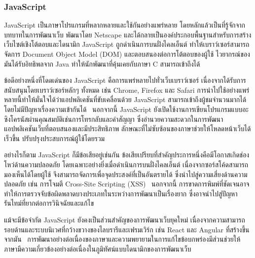 \documentclass[12pt,oneside,openright,a4paper]{cpe-thai-project}
\begin{document}
        \subsubsection{JavaScript}
            \begin{flushleft}
                JavaScript เป็นภาษาโปรแกรมที่หลากหลายและใช้กันอย่างแพร่หลาย โดยหลักแล้วเป็นที่รู้จักจากบทบาทในการพัฒนาเว็บ พัฒนาโดย Netscape และได้กลายเป็นองค์ประกอบพื้นฐานสำหรับการสร้างเว็บไซต์เชิงโต้ตอบและไดนามิก JavaScript ถูกดำเนินการบนฝั่งไคลเอ็นต์ ทำให้เบราว์เซอร์สามารถจัดการ Document Object Model (DOM) และตอบสนองต่อการโต้ตอบของผู้ใช้ ไวยากรณ์ของมันได้รับอิทธิพลจาก Java ทำให้นักพัฒนาที่คุ้นเคยกับภาษา C สามารถเข้าถึงได้~\cite{flanagan20js}
            \end{flushleft}
            \begin{flushleft}
                ข้อดีอย่างหนึ่งที่โดดเด่นของ JavaScript คือการแพร่หลายไปทั่วเว็บเบราว์เซอร์ เนื่องจากได้รับการสนับสนุนโดยเบราว์เซอร์หลักๆ ทั้งหมด เช่น Chrome, Firefox และ Safari การนำไปใช้อย่างแพร่หลายนี้ทำให้มั่นใจได้ว่าแอปพลิเคชันที่ขับเคลื่อนด้วย JavaScript สามารถเข้าถึงผู้ชมจำนวนมากได้โดยไม่มีปัญหาเรื่องความเข้ากันได้~\cite{flanagan20js} นอกจากนี้ JavaScript ยังเปิดใช้งานการเขียนโปรแกรมแบบอะซิงโครนัสผ่านคุณสมบัติเช่นการโทรกลับและคำสัญญา ซึ่งอำนวยความสะดวกในการพัฒนาแอปพลิเคชันเว็บที่ตอบสนองและมีประสิทธิภาพ ลักษณะที่ไม่ซับซ้อนของภาษาช่วยให้โหลดหน้าเว็บได้เร็วขึ้น ปรับปรุงประสบการณ์ผู้ใช้โดยรวม~\cite{crockford08js}
            \end{flushleft}
            \begin{flushleft}
                อย่างไรก็ตาม JavaScript ก็มีข้อเสียอยู่เช่นกัน ข้อเสียเปรียบที่สำคัญประการหนึ่งคือมีโอกาสเกิดช่องโหว่ด้านความปลอดภัย โดยเฉพาะอย่างยิ่งเมื่อดำเนินการบนฝั่งไคลเอ็นต์ เนื่องจากซอร์สโค้ดสามารถมองเห็นได้โดยผู้ใช้ จึงสามารถจัดการเพื่อจุดประสงค์ที่เป็นอันตรายได้ ซึ่งนำไปสู่ความเสี่ยงด้านความปลอดภัย เช่น การโจมตี Cross-Site Scripting (XSS)~\cite{flanagan20js} นอกจากนี้ การขาดการพิมพ์ที่ชัดเจนอาจทำให้การตรวจจับข้อผิดพลาดบางประเภทในระหว่างการพัฒนาเป็นเรื่องยาก ซึ่งอาจนำไปสู่ปัญหารันไทม์ที่ยากต่อการวินิจฉัยและแก้ไข~\cite{crockford08js}
            \end{flushleft}
            \begin{flushleft}
                แม้จะมีข้อจำกัด JavaScript ยังคงเป็นส่วนสำคัญของการพัฒนาเว็บยุคใหม่ เนื่องจากความสามารถรอบด้านและระบบนิเวศที่กว้างขวางของไลบรารีและเฟรมเวิร์ก เช่น React และ Angular ที่สร้างขึ้นจากมัน~\cite{flanagan20js} การพัฒนาอย่างต่อเนื่องของภาษาและความพยายามในการแก้ไขข้อบกพร่องมีส่วนช่วยให้ภาษามีความเกี่ยวข้องอย่างต่อเนื่องในภูมิทัศน์แบบไดนามิกของการพัฒนาเว็บ~\cite{crockford08js}
            \end{flushleft}
        \pagebreak
\end{document}
